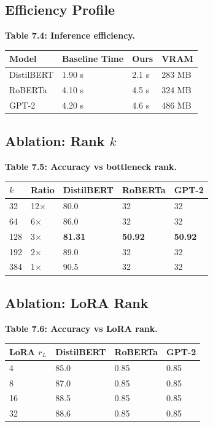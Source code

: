 \subsection{Efficiency Profile}

\textbf{Table 7.4: Inference efficiency.}

\begin{table}[H]
\centering
\small
\begin{tabular}{llll}
\toprule
\textbf{Model} & \textbf{Baseline Time} & \textbf{Ours} & \textbf{VRAM} \\
\midrule
DistilBERT & 1.90 s & 2.1 s & 283 MB \\
RoBERTa & 4.10 s & 4.5 s & 324 MB \\
GPT-2 & 4.20 s & 4.6 s & 486 MB \\
\bottomrule
\end{tabular}
\end{table}

\subsection{Ablation: Rank $k$}

\textbf{Table 7.5: Accuracy vs bottleneck rank.}

\begin{table}[H]
\centering
\small
\begin{tabular}{lllll}
\toprule
\textbf{$k$} & \textbf{Ratio} & \textbf{DistilBERT} & \textbf{RoBERTa} & \textbf{GPT-2} \\
\midrule
32 & 12$\times$ & 80.0 & 32 & 32 \\
64 & 6$\times$ & 86.0 & 32 & 32 \\
128 & 3$\times$ & \textbf{81.31} & \textbf{50.92} & \textbf{50.92} \\
192 & 2$\times$ & 89.0 & 32 & 32 \\
384 & 1$\times$ & 90.5 & 32 & 32 \\
\bottomrule
\end{tabular}
\end{table}

\subsection{Ablation: LoRA Rank}

\textbf{Table 7.6: Accuracy vs LoRA rank.}

\begin{table}[H]
\centering
\small
\begin{tabular}{llll}
\toprule
\textbf{LoRA $r_L$} & \textbf{DistilBERT} & \textbf{RoBERTa} & \textbf{GPT-2} \\
\midrule
4 & 85.0 & 0.85 & 0.85 \\
8 & 87.0 & 0.85 & 0.85 \\
16 & 88.5 & 0.85 & 0.85 \\
32 & 88.6 & 0.85 & 0.85 \\
\bottomrule
\end{tabular}
\end{table}

